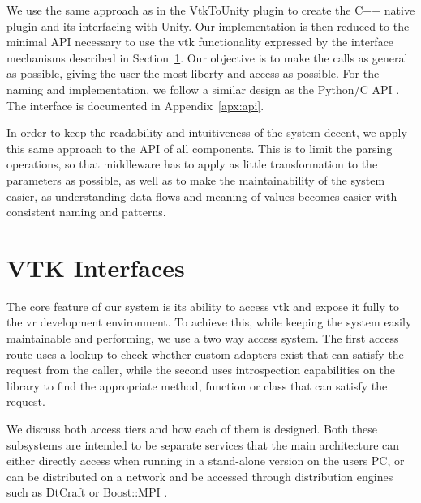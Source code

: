 
We use the same approach as in the VtkToUnity plugin to create the C++ native plugin and its interfacing with Unity. Our implementation is then reduced to the minimal API necessary to use the \acrshort{vtk} functionality expressed by the interface mechanisms described in Section~\ref{sec:design-interfaces}. Our objective is to make the calls as general as possible, giving the user the most liberty and access as possible. For the naming and implementation, we follow a similar design as the Python/C API \cite{python_c_api}. The interface is documented in Appendix~\ref{apx:api}.

In order to keep the readability and intuitiveness of the system decent, we apply this same approach to the API of all components. This is to limit the parsing operations, so that middleware has to apply as little transformation to the parameters as possible, as well as to make the maintainability of the system easier, as understanding data flows and meaning of values becomes easier with consistent naming and patterns.

\section{VTK Interfaces}
\label{sec:design-interfaces}

The core feature of our system is its ability to access \acrshort{vtk} and expose it fully to the \acrshort{vr} development environment. To achieve this, while keeping the system easily maintainable and performing, we use a two way access system. The first access route uses a lookup to check whether custom adapters exist that can satisfy the request from the caller, while the second uses introspection capabilities on the library to find the appropriate method, function or class that can satisfy the request.

We discuss both access tiers and how each of them is designed. Both these subsystems are intended to be separate services that the main architecture can either directly access when running in a stand-alone version on the users PC, or can be distributed on a network and be accessed through distribution engines such as DtCraft \cite{huang2017dtcraft} or Boost::MPI \cite{schaling2011boost}.

